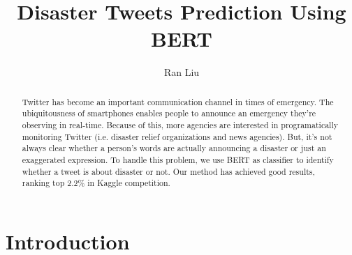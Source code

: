 \documentclass{amsart}
\begin{document}
%
%
\title[Disaster Tweets Prediction]{Disaster Tweets Prediction Using BERT}%

\author{Ran Liu}
\address[]{Institute of Information Engineering\\ 
Chinese Academy of Sciences, Beijing 100084, China}%



\date{\gitAuthorDate}%

%
\begin{abstract}
    Twitter has become an important communication channel in times of emergency. The ubiquitousness of smartphones enables people to announce an emergency they’re observing in real-time. Because of this, more agencies are interested in programatically monitoring Twitter (i.e. disaster relief organizations and news agencies). But, it’s not always clear whether a person’s words are actually announcing a disaster or just an exaggerated expression. To handle this problem, we use BERT as classifier to identify whether a tweet is about disaster or not. Our method has achieved good results, ranking top 2.2$\%$ in Kaggle competition.
    \end{abstract}
    


\maketitle
\tableofcontents

\newpage

%

\section{Introduction}\label{sec-intro}





\end{document}
